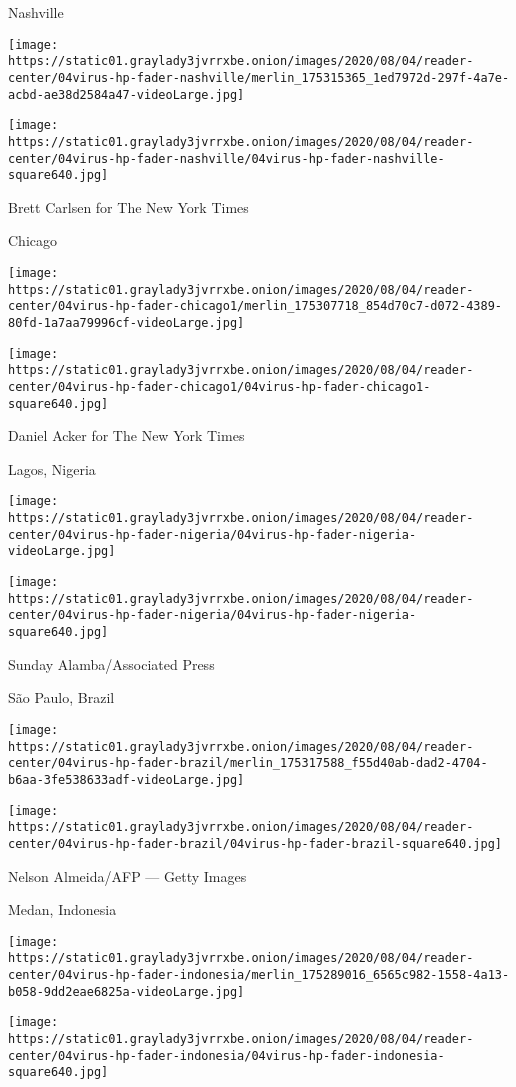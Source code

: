 \href{https://www.nytimes3xbfgragh.onion/2020/08/04/world/coronavirus-covid-19.html}{}

Nashville

\texttt{[image: https://static01.graylady3jvrrxbe.onion/images/2020/08/04/reader-center/04virus-hp-fader-nashville/merlin\_175315365\_1ed7972d-297f-4a7e-acbd-ae38d2584a47-videoLarge.jpg]}

\texttt{[image: https://static01.graylady3jvrrxbe.onion/images/2020/08/04/reader-center/04virus-hp-fader-nashville/04virus-hp-fader-nashville-square640.jpg]}

 Brett Carlsen for The New York Times

Chicago

\texttt{[image: https://static01.graylady3jvrrxbe.onion/images/2020/08/04/reader-center/04virus-hp-fader-chicago1/merlin\_175307718\_854d70c7-d072-4389-80fd-1a7aa79996cf-videoLarge.jpg]}

\texttt{[image: https://static01.graylady3jvrrxbe.onion/images/2020/08/04/reader-center/04virus-hp-fader-chicago1/04virus-hp-fader-chicago1-square640.jpg]}

 Daniel Acker for The New York Times

Lagos, Nigeria

\texttt{[image: https://static01.graylady3jvrrxbe.onion/images/2020/08/04/reader-center/04virus-hp-fader-nigeria/04virus-hp-fader-nigeria-videoLarge.jpg]}

\texttt{[image: https://static01.graylady3jvrrxbe.onion/images/2020/08/04/reader-center/04virus-hp-fader-nigeria/04virus-hp-fader-nigeria-square640.jpg]}

 Sunday Alamba/Associated Press

São Paulo, Brazil

\texttt{[image: https://static01.graylady3jvrrxbe.onion/images/2020/08/04/reader-center/04virus-hp-fader-brazil/merlin\_175317588\_f55d40ab-dad2-4704-b6aa-3fe538633adf-videoLarge.jpg]}

\texttt{[image: https://static01.graylady3jvrrxbe.onion/images/2020/08/04/reader-center/04virus-hp-fader-brazil/04virus-hp-fader-brazil-square640.jpg]}

 Nelson Almeida/AFP --- Getty Images

Medan, Indonesia

\texttt{[image: https://static01.graylady3jvrrxbe.onion/images/2020/08/04/reader-center/04virus-hp-fader-indonesia/merlin\_175289016\_6565c982-1558-4a13-b058-9dd2eae6825a-videoLarge.jpg]}

\texttt{[image: https://static01.graylady3jvrrxbe.onion/images/2020/08/04/reader-center/04virus-hp-fader-indonesia/04virus-hp-fader-indonesia-square640.jpg]}

